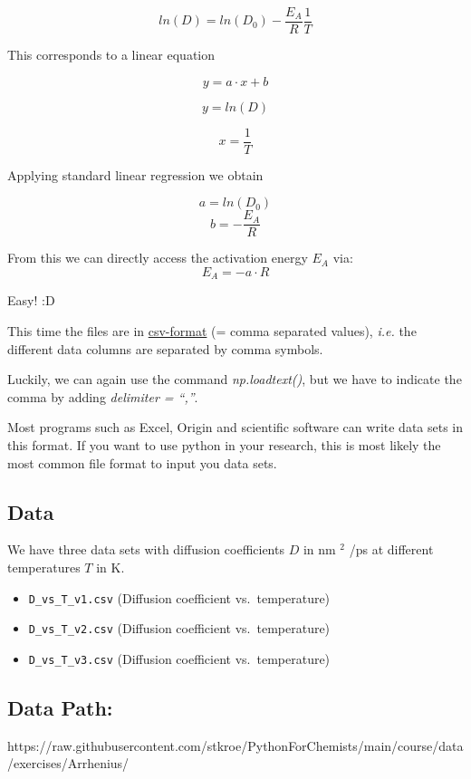 \documentclass[
  letterpaper,
  DIV=11,
  numbers=noendperiod]{scrreprt}
\providecommand{\tightlist}{%
  \setlength{\itemsep}{0pt}\setlength{\parskip}{0pt}}\usepackage{longtable,booktabs,array}
\begin{document}
\[ ln(D) = ln(D_0) - \frac{E_A}{R}\frac{1}{T} \]

This corresponds to a linear equation

\[ y = a\cdot x + b\]

\[y = ln(D)\]

\[ x= \frac{1}{T}\]

Applying standard linear regression we obtain

\[a=ln(D_0)\] \[b = -\frac{E_A}{R}\]

From this we can directly access the activation energy \(E_A\) via:
\[ E_A = - a \cdot R \]

Easy! :D

This time the files are in
\href{https://en.wikipedia.org/wiki/Comma-separated_values}{csv-format}
(= comma separated values), \emph{i.e.} the different data columns are
separated by comma symbols.

Luckily, we can again use the command \emph{np.loadtext()}, but we have
to indicate the comma by adding \emph{delimiter = ``,''}.

Most programs such as Excel, Origin and scientific software can write
data sets in this format. If you want to use python in your research,
this is most likely the most common file format to input you data sets.

\subsection{Data}\label{data-3}

We have three data sets with diffusion coefficients \(D\) in nm \(^2\)
/ps at different temperatures \(T\) in K.

\begin{itemize}
\tightlist
\item
  \texttt{D\_vs\_T\_v1.csv} (Diffusion coefficient vs.~temperature)
\item
  \texttt{D\_vs\_T\_v2.csv} (Diffusion coefficient vs.~temperature)
\item
  \texttt{D\_vs\_T\_v3.csv} (Diffusion coefficient vs.~temperature)
\end{itemize}

\subsection{Data Path:}\label{data-path-3}

https://raw.githubusercontent.com/stkroe/PythonForChemists/main/course/data/exercises/Arrhenius/
\end{document}
